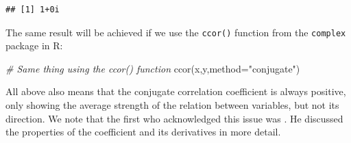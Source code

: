 \documentclass[
]{book}
\newenvironment{Shaded}{\begin{snugshade}}{\end{snugshade}}
\newcommand{\AttributeTok}[1]{\textcolor[rgb]{0.77,0.63,0.00}{#1}}
\newcommand{\CommentTok}[1]{\textcolor[rgb]{0.56,0.35,0.01}{\textit{#1}}}
\newcommand{\FunctionTok}[1]{\textcolor[rgb]{0.00,0.00,0.00}{#1}}
\newcommand{\NormalTok}[1]{#1}
\newcommand{\StringTok}[1]{\textcolor[rgb]{0.31,0.60,0.02}{#1}}
\begin{document}
\begin{verbatim}
## [1] 1+0i
\end{verbatim}

The same result will be achieved if we use the \texttt{ccor()} function from the \texttt{complex} package in R:

\begin{Shaded}
\begin{Highlighting}[]
\CommentTok{\# Same thing using the ccor() function}
\FunctionTok{ccor}\NormalTok{(x,y,}\AttributeTok{method=}\StringTok{"conjugate"}\NormalTok{)}
\end{Highlighting}
\end{Shaded}

All above also means that the conjugate correlation coefficient is always positive, only showing the average strength of the relation between variables, but not its direction. We note that the first who acknowledged this issue was \citet{Schreier2010}. He discussed the properties of the coefficient and its derivatives in more detail.
\end{document}
